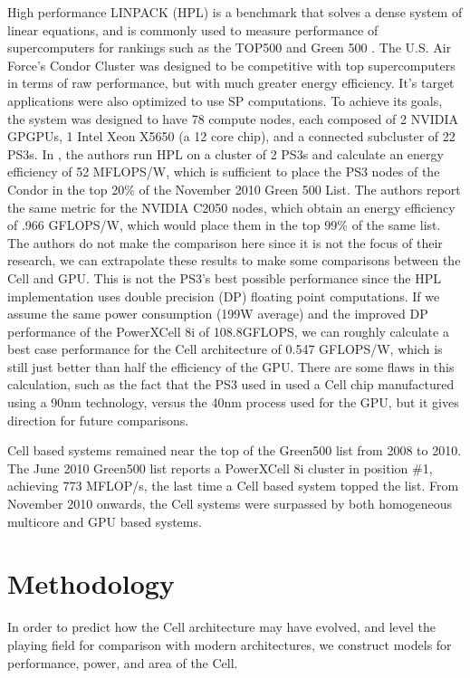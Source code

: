 \documentclass{sig-alternate-05-2015}
\begin{document}
High performance LINPACK (HPL) is a benchmark that solves a dense system of linear equations, and is commonly used to measure performance of supercomputers for rankings such as the TOP500 \cite{about_hpl} and Green 500 \cite{green500}. The U.S. Air Force's Condor Cluster was designed to be competitive with top supercomputers in terms of raw performance, but with much greater energy efficiency. It's target applications were also optimized to use SP computations. To achieve its goals, the system was designed to have 78 compute nodes, each composed of 2 NVIDIA GPGPUs, 1 Intel Xeon X5650 (a 12 core chip), and a connected subcluster of 22 PS3s. In \cite{luley2011energy}, the authors run HPL on a cluster of 2 PS3s and calculate an energy efficiency of 52 MFLOPS/W, which is sufficient to place the PS3 nodes of the Condor in the top 20\% of the November 2010 Green 500 List. The authors report the same metric for the NVIDIA C2050 nodes, which obtain an energy efficiency of .966 GFLOPS/W, which would place them in the top 99\% of the same list. The authors do not make the comparison here since it is not the focus of their research, we can extrapolate these results to make some comparisons between the Cell and GPU. This is not the PS3's best possible performance since the HPL implementation uses double precision (DP) floating point computations. If we assume the same power consumption (199W average) and the improved DP performance of the PowerXCell 8i of 108.8GFLOPS, we can roughly calculate a best case performance for the Cell architecture of 0.547 GFLOPS/W, which is still just better than half the efficiency of the GPU. There are some flaws in this calculation, such as the fact that the PS3 used in \cite{luley2011energy} used a Cell chip manufactured using a 90nm technology, versus the 40nm \cite{techpowerup} process used for the GPU, but it gives direction for future comparisons.

Cell based systems remained near the top of the Green500 list from 2008 to 2010. The June 2010 Green500 list \cite{green500_062010} reports a PowerXCell 8i cluster in position \#1, achieving 773 MFLOP/s, the last time a Cell based system topped the list. From November 2010 onwards, the Cell systems were surpassed by both homogeneous multicore and GPU based systems. 

\section{Methodology}

In order to predict how the Cell architecture may have evolved, and level the playing field for comparison with modern architectures, we construct models for performance, power, and area of the Cell.
\end{document}
